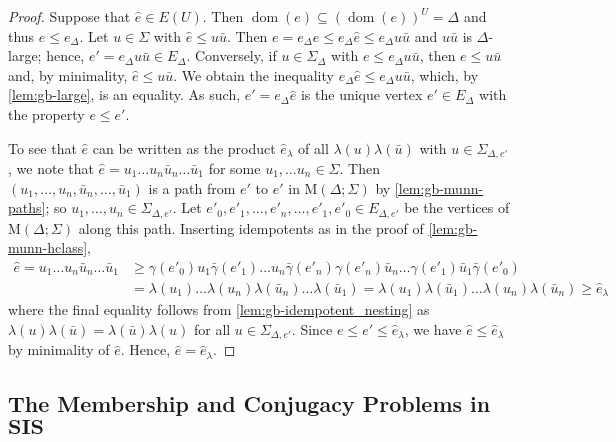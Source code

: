 \documentclass[anonymous,letter,UKenglish,cleveref,autoref,thm-restate]{lipics-v2021}
\renewcommand{\geq}{\geqslant}
\renewcommand{\leq}{\leqslant}
\newcommand{\sse}{\subseteq}
\newcommand{\dom}{\operatorname{dom}}
\newcommand{\vSI}{\ensuremath{\mathbf{SIS}}}
\theoremstyle{plain}
\theoremstyle{plain}
\begin{document}
\begin{proof}
  Suppose that $\hat e \in E(U)$.
  Then $\dom(e) \sse (\dom(e))^U = \Delta$ and thus $e \leq e_\Delta$.
  Let $u \in \Sigma$ with $\hat e \leq u \bar u$.
  Then $e = e_\Delta e \leq e_\Delta \hat e \leq e_\Delta u \bar u$ and $u \bar u$ is $\Delta$-large; hence, $e' = e_\Delta u \bar u \in E_\Delta$.
  Conversely, if $u \in \Sigma_\Delta$ with $e \leq e_\Delta u \bar u$, then $e \leq u \bar u$ and, by minimality, $\hat e \leq u \bar u$.
  We obtain the inequality $e_\Delta \hat e \leq e_\Delta u \bar u$, which, by \cref{lem:gb-large}, is an equality.
  As such, $e' = e_\Delta \hat e$ is the unique vertex $e' \in E_\Delta$ with the property $e \leq e'$.

  To see that $\hat e$ can be written as the product $\hat e_\lambda$ of all $\lambda(u)\lambda(\bar u)$ with $u \in \Sigma_{\Delta, e'}$, we note that $\hat e = u_1 \dotsc u_n \bar u_n \dotsc \bar u_1$ for some $u_1, \dotsc u_n \in \Sigma$.
  Then $(u_1, \dotsc, u_n, \bar u_n, \dotsc, \bar u_1)$ is a path from $e'$ to $e'$ in $\mathrm{M}(\Delta; \Sigma)$ by \cref{lem:gb-munn-paths}; so $u_1, \dotsc, u_n \in \Sigma_{\Delta, e'}$.
  Let $e'_0, e'_1, \dotsc, e'_n, \dotsc, e'_1, e'_0 \in E_{\Delta, e'}$ be the vertices of $\mathrm{M}(\Delta; \Sigma)$ along this path.
  Inserting idempotents as in the proof of \cref{lem:gb-munn-hclass},
  \begin{align*}
    \hat e = u_1 \dotsc u_n \bar u_n \dotsc \bar u_1 &\geq \gamma(e'_0) u_1 \bar\gamma(e'_1) \dotsc u_n \bar\gamma(e'_n) \gamma(e'_n) \bar u_n \dotsc \gamma(e'_1)\bar u_1\bar \gamma(e'_0) \\
      &= \lambda(u_1) \dotsc \lambda(u_n)\lambda(\bar u_n) \dotsc \lambda(\bar u_1) = \lambda(u_1)\lambda(\bar u_1) \dotsc \lambda(u_n) \lambda(\bar u_n) \geq \hat e_\lambda
  \end{align*}
  where the final equality follows from \cref{lem:gb-idempotent_nesting} as $\lambda(u)\lambda(\bar u) = \lambda(\bar u)\lambda(u)$ for all $u \in \Sigma_{\Delta,e'}$.
  Since $e \leq e'\leq \hat  e_\lambda$, we have $\hat e \leq \hat e_\lambda$ by minimality of $\hat e$. 
  Hence, $\hat e = \hat e_\lambda$.
\end{proof}



\subsection{The Membership and Conjugacy Problems in $\vSI$}\label{sub:sis}
\end{document}

